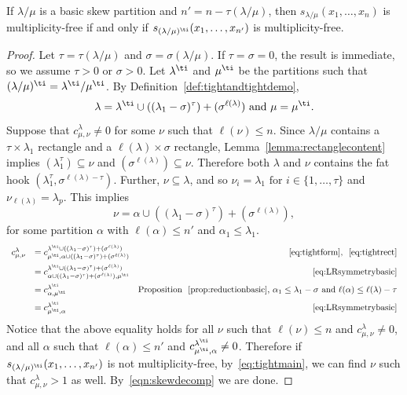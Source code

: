 \begin{prop}
\label{prop:reductiontight}
If $\lambda / \mu$ is a basic skew partition and $n' = n - \tau(\lambda / \mu)$, then $s_{\lambda / \mu}(x_1,\ldots,x_n)$ is multiplicity-free if and only if $s_{(\lambda / \mu)^\ti }(x_1,\ldots,x_{n'})$ is multiplicity-free.
\end{prop}
\begin{proof}
Let $\tau = \tau(\lambda / \mu)$ and $\sigma = \sigma(\lambda/\mu)$. If $\tau = \sigma = 0$, the result is immediate, so we assume $\tau > 0$ or $\sigma > 0$. Let $\lambda^\ti $ and $\mu^\ti $ be the partitions such that $(\lambda / \mu)^\ti = \lambda^\ti / \mu^\ti $. By Definition~\ref{def:tightandtightdemo}, 
\begin{equation}
\label{eq:tightform}
\lambda = \lambda^\ti \cup ((\lambda_1-\sigma)^\tau) + (\sigma^{\ell(\lambda)}) \text{ and }\mu = \mu^\ti . 
\end{equation}
Suppose that $c_{\mu,\nu}^{\lambda} \neq 0$ for some $\nu$ such that $\ell(\nu) \leq n$. Since $\lambda / \mu$ contains a $\tau \times \lambda_1$ rectangle and a $\ell(\lambda)\times \sigma$ rectangle, Lemma~\ref{lemma:rectanglecontent} implies $(\lambda_1^\tau) \subseteq \nu$ and $(\sigma^{\ell(\lambda)})\subseteq \nu$. Therefore both $\lambda$ and $\nu$ contains the fat hook $(\lambda_1^{\tau}, \sigma^{\ell(\lambda)-\tau})$. Further, $\nu \subseteq \lambda$, and so $\nu_i = \lambda_1\text{ for }i \in \{1,\ldots,\tau \}$ and $\nu_{\ell(\lambda)} = \lambda_p$. This implies
\begin{equation}
\label{eq:tightrect}
\nu = \alpha \cup ((\lambda_1-\sigma)^\tau) + (\sigma^{\ell(\lambda)}),
\end{equation}
for some partition $\alpha$ with $\ell(\alpha) \leq n'$ and $\alpha_1 \leq \lambda_1$.
\begin{equation}
\begin{array}{rlr}
\label{eq:tightmain}
c_{\mu,\nu}^{\lambda} & = c_{\mu^\ti ,\alpha \cup ((\lambda_1-\sigma)^\tau) + (\sigma^{\ell(\lambda)})}^{\lambda^\ti \cup ((\lambda_1-\sigma)^\tau) + (\sigma^{\ell(\lambda)})} &~\eqref{eq:tightform}\text{, }~\eqref{eq:tightrect}\\[7pt]
& = c_{\alpha \cup ((\lambda_1-\sigma)^\tau) + (\sigma^{\ell(\lambda)}),\mu^\ti }^{\lambda^\ti \cup ((\lambda_1-\sigma)^\tau) + (\sigma^{\ell(\lambda)})} &~\eqref{eq:LRsymmetrybasic}\\[7pt]
& = c_{\alpha,\mu^\ti }^{\lambda^\ti } & \text{Proposition }~\ref{prop:reductionbasic}\text{, }\alpha_1 \leq \lambda_1-\sigma\text{ and }\ell(\alpha)\leq \ell(\lambda)-\tau \\[7pt]
& = c_{\mu^\ti , \alpha}^{\lambda^\ti } &~\eqref{eq:LRsymmetrybasic}
\end{array}
\end{equation}
Notice that the above equality holds for all $\nu$ such that $\ell(\nu) \leq n$ and $c_{\mu,\nu}^{\lambda} \neq 0$, and all $\alpha$ such that $\ell(\alpha) \leq n'$ and $c_{\mu^\ti , \alpha}^{\lambda^\ti } \neq 0$. Therefore if $s_{(\lambda/\mu)^\ti }(x_1,\ldots,x_{n'})$ is not multiplicity-free, by~\eqref{eq:tightmain}, we can find $\nu$ such that $c^{\lambda}_{\mu,\nu}> 1$ as well. By~\eqref{eqn:skewdecomp} we are done.
\end{proof}
